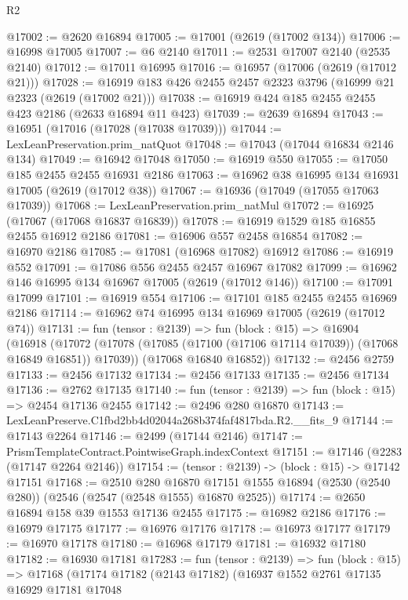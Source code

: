 \begin{lexlean}{R2}
\begin{coremodule}
@17002 := @2620 @16894
@17005 := @17001 (@2619 (@17002 @134))
@17006 := @16998 @17005
@17007 := @6 @2140
@17011 := @2531 @17007 @2140 (@2535 @2140)
@17012 := @17011 @16995
@17016 := @16957 (@17006 (@2619 (@17012 @21)))
@17028 := @16919 @183 @426 @2455 @2457 @2323 @3796 (@16999 @21 @2323 (@2619 (@17002 @21)))
@17038 := @16919 @424 @185 @2455 @2455 @423 @2186 (@2633 @16894 @11 @423)
@17039 := @2639 @16894
@17043 := @16951 (@17016 (@17028 (@17038 @17039)))
@17044 := LexLeanPreservation.prim_natQuot
@17048 := @17043 (@17044 @16834 @2146 @134)
@17049 := @16942 @17048
@17050 := @16919 @550
@17055 := @17050 @185 @2455 @2455 @16931 @2186
@17063 := @16962 @38 @16995 @134 @16931 @17005 (@2619 (@17012 @38))
@17067 := @16936 (@17049 (@17055 @17063 @17039))
@17068 := LexLeanPreservation.prim_natMul
@17072 := @16925 (@17067 (@17068 @16837 @16839))
@17078 := @16919 @1529 @185 @16855 @2455 @16912 @2186
@17081 := @16906 @557 @2458 @16854
@17082 := @16970 @2186
@17085 := @17081 (@16968 @17082) @16912
@17086 := @16919 @552
@17091 := @17086 @556 @2455 @2457 @16967 @17082
@17099 := @16962 @146 @16995 @134 @16967 @17005 (@2619 (@17012 @146))
@17100 := @17091 @17099
@17101 := @16919 @554
@17106 := @17101 @185 @2455 @2455 @16969 @2186
@17114 := @16962 @74 @16995 @134 @16969 @17005 (@2619 (@17012 @74))
@17131 := fun (tensor : @2139) =>
  fun (block : @15) =>
  @16904
    (@16918
      (@17072 (@17078 (@17085 (@17100 (@17106 @17114 @17039)) (@17068 @16849 @16851)) @17039))
      (@17068 @16840 @16852))
@17132 := @2456 @2759
@17133 := @2456 @17132
@17134 := @2456 @17133
@17135 := @2456 @17134
@17136 := @2762 @17135
@17140 := fun (tensor : @2139) => fun (block : @15) => @2454 @17136 @2455
@17142 := @2496 @280 @16870
@17143 := LexLeanPreserve.C1fbd2bb4d02044a268b374faf4817bda.R2.__fits_9
@17144 := @17143 @2264
@17146 := @2499 (@17144 @2146)
@17147 := PrismTemplateContract.PointwiseGraph.indexContext
@17151 := @17146 (@2283 (@17147 @2264 @2146))
@17154 := (tensor : @2139) -> (block : @15) -> @17142 @17151
@17168 := @2510
    @280
    @16870
    @17151
    @1555
    @16894
    (@2530 (@2540 @280))
    (@2546 (@2547 (@2548 @1555) @16870 @2525))
@17174 := @2650 @16894 @158 @39 @1553 @17136 @2455
@17175 := @16982 @2186
@17176 := @16979 @17175
@17177 := @16976 @17176
@17178 := @16973 @17177
@17179 := @16970 @17178
@17180 := @16968 @17179
@17181 := @16932 @17180
@17182 := @16930 @17181
@17283 := fun (tensor : @2139) =>
  fun (block : @15) =>
  @17168
    (@17174
      @17182
      (@2143 @17182)
      (@16937
        @1552
        @2761
        @17135
        @16929
        @17181
        @17048

\end{coremodule}
\end{lexlean}
